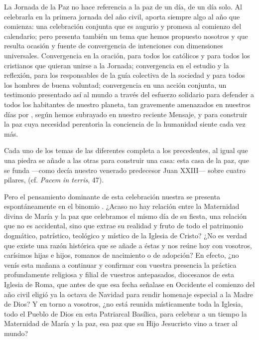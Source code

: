 La Jornada de la Paz no hace referencia a la paz de un día, de un día solo. Al celebrarla en la primera jornada del año civil, aporta siempre algo al año que comienza: una celebración conjunta que es augurio y promesa al comienzo del calendario; pero presenta también un tema que hemos propuesto nosotros y que resulta ocasión y fuente de convergencia de intenciones con dimensiones universales. Convergencia en la oración, para todos los católicos y para todos los cristianos que quieran unirse a la Jornada; convergencia en el estudio y la reflexión, para los responsables de la guía colectiva de la sociedad y para todos los hombres de buena voluntad; convergencia en una acción conjunta, un testimonio presentado así al mundo a través del esfuerzo solidario para defender a todos los habitantes de nuestro planeta, tan gravemente amenazados en nuestros días por , según hemos subrayado en nuestro reciente Mensaje, y para construir la paz cuya necesidad perentoria la conciencia de la humanidad siente cada vez más.

Cada uno de los temas de las diferentes  completa a los precedentes, al igual que una piedra se añade a las otras para construir una casa: esta casa de la paz, que se funda ---como decía nuestro venerado predecesor Juan XXIII--- sobre cuatro pilares,  (cf. \emph{Pacem in terris}, 47).

Pero el pensamiento dominante de esta celebración nuestra se presenta espontáneamente en el binomio . ¿Acaso no hay relación entre la Maternidad divina de María y la paz que celebramos el mismo día de su fiesta, una relación que no es accidental, sino que extrae su realidad y fruto de todo el patrimonio dogmático, patrístico, teológico y místico de la Iglesia de Cristo? ¿No es verdad que existe una razón histórica que se añade a éstas y nos reúne hoy con vosotros, carísimos hijas e hijos, romanos de nacimiento o de adopción? En efecto, ¿no venís esta mañana a continuar y confirmar con vuestra presencia la práctica profundamente religiosa y filial de vuestros antepasados, diocesanos de esta Iglesia de Roma, que antes de que esa fecha señalase en Occidente el comienzo del año civil eligió ya la octava de Navidad para rendir homenaje especial a la Madre de Dios? Y en torno a vosotros, ¿no está reunida místicamente toda la Iglesia, todo el Pueblo de Dios en esta Patriarcal Basílica, para celebrar a un tiempo la Maternidad de María y la paz, esa paz que su Hijo Jesucristo vino a traer al mundo?

